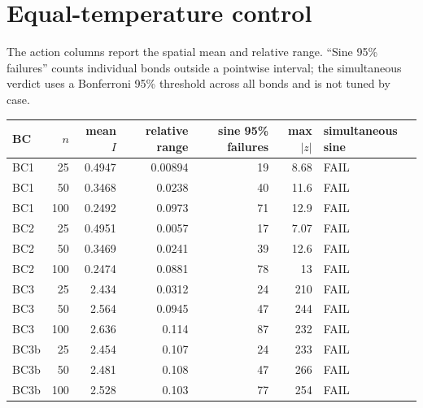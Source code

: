 \documentclass[10pt]{article}
\begin{document}
\section*{Equal-temperature control}
The action columns report the spatial mean and relative range.  ``Sine 95\%
failures'' counts individual bonds outside a pointwise interval; the simultaneous
verdict uses a Bonferroni 95\% threshold across all bonds and is not tuned by
case.
\begin{center}\small
\begin{tabular}{lrrrrrl}
\toprule BC & $n$ & mean $I$ & relative range & sine 95\% failures & max $|z|$ & simultaneous sine\\
\midrule
BC1 & 25 & 0.4947 & 0.00894 & 19 & 8.68 & FAIL \\
BC1 & 50 & 0.3468 & 0.0238 & 40 & 11.6 & FAIL \\
BC1 & 100 & 0.2492 & 0.0973 & 71 & 12.9 & FAIL \\
BC2 & 25 & 0.4951 & 0.0057 & 17 & 7.07 & FAIL \\
BC2 & 50 & 0.3469 & 0.0241 & 39 & 12.6 & FAIL \\
BC2 & 100 & 0.2474 & 0.0881 & 78 & 13 & FAIL \\
BC3 & 25 & 2.434 & 0.0312 & 24 & 210 & FAIL \\
BC3 & 50 & 2.564 & 0.0945 & 47 & 244 & FAIL \\
BC3 & 100 & 2.636 & 0.114 & 87 & 232 & FAIL \\
BC3b & 25 & 2.454 & 0.107 & 24 & 233 & FAIL \\
BC3b & 50 & 2.481 & 0.108 & 47 & 266 & FAIL \\
BC3b & 100 & 2.528 & 0.103 & 77 & 254 & FAIL \\
\bottomrule\end{tabular}\end{center}
\end{document}
